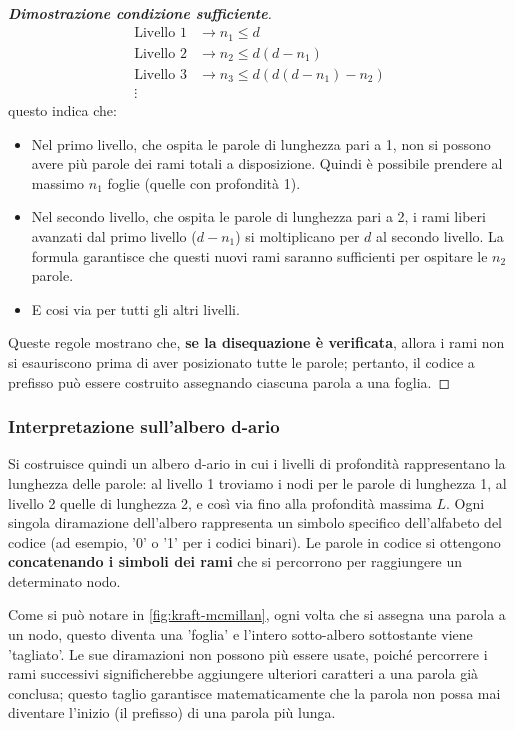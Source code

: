 \documentclass{article}
\theoremstyle{definition}
\numberwithin{equation}{section}
\begin{document}
\begin{proof}[\textbf{Dimostrazione condizione sufficiente}]
    \begin{align*}
        \text{Livello 1} & \xrightarrow{} n_1 \leq d               \\
        \text{Livello 2} & \xrightarrow{} n_2 \leq d(d-n_1)        \\
        \text{Livello 3} & \xrightarrow{} n_3 \leq d(d(d-n_1)-n_2) \\
        \vdots
    \end{align*}
    questo indica che:
    \begin{itemize}
        \item  Nel primo livello, che ospita le parole di lunghezza pari a 1, non si possono avere più parole dei rami totali a disposizione. Quindi è possibile prendere al massimo $n_1$ foglie (quelle con profondità 1).
        \item Nel secondo livello, che ospita le parole di lunghezza pari a 2, i rami liberi avanzati dal primo livello ($d-n_1$) si moltiplicano per $d$ al secondo livello. La formula garantisce che questi nuovi rami saranno sufficienti per ospitare le $n_2$ parole.
        \item E cosi via per tutti gli altri livelli.
    \end{itemize}

    \noindent Queste regole mostrano che, \textbf{se la disequazione è verificata}, allora i rami non si esauriscono prima di aver posizionato tutte le parole; pertanto, il codice a prefisso può essere costruito assegnando ciascuna parola a una foglia.
\end{proof}

\subsubsection{Interpretazione sull'albero d-ario}
Si costruisce quindi un albero d-ario in cui i livelli di profondità rappresentano la lunghezza delle parole: al livello 1 troviamo i nodi per le parole di lunghezza 1, al livello 2 quelle di lunghezza 2, e così via fino alla profondità massima $L$. Ogni singola diramazione dell'albero rappresenta un simbolo specifico dell'alfabeto del codice (ad esempio, '0' o '1' per i codici binari). Le parole in codice si ottengono \textbf{concatenando i simboli dei rami} che si percorrono per raggiungere un determinato nodo.

Come si può notare in \autoref{fig:kraft-mcmillan}, ogni volta che si assegna una parola a un nodo, questo diventa una 'foglia' e l'intero sotto-albero sottostante viene 'tagliato'. Le sue diramazioni non possono più essere usate, poiché percorrere i rami successivi significherebbe aggiungere ulteriori caratteri a una parola già conclusa; questo taglio garantisce matematicamente che la parola non possa mai diventare l'inizio (il prefisso) di una parola più lunga.
\end{document}
